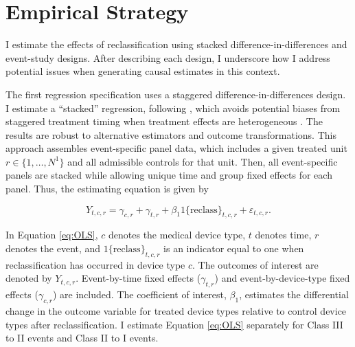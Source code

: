 \documentclass[letterpaper,12pt]{article}
\theoremstyle{definition}
\begin{document}
\section{Empirical Strategy}\label{sec:Empirical}
I estimate the effects of reclassification using stacked difference-in-differences and event-study designs. After describing each design, I underscore how I address potential issues when generating causal estimates in this context.

The first regression specification uses a staggered difference-in-differences design. I estimate a ``stacked'' regression, following \citet{cengiz2019effect}, which avoids potential biases from staggered treatment timing when treatment effects are heterogeneous \citep{goodman2018difference,de2019two}. The results are robust to alternative estimators and outcome transformations.\footnotemark {} This approach assembles event-specific panel data, which includes a given treated unit $r \in \{1,\dots, N^1\}$ and all admissible controls for that unit. Then, all event-specific panels are stacked while allowing unique time and group fixed effects for each panel. Thus, the estimating equation is given by



\begin{equation}
Y_{t,c,r}=\gamma_{c,r} + \gamma_{t,r} + \beta_1 1\text{\{reclass\}}_{t,c,r} + \varepsilon_{t, c,r} \label{eq:OLS}.
\end{equation}


In Equation \ref{eq:OLS}, $c$ denotes the medical device type, $t$ denotes time, $r$ denotes the event, and $1\text{\{reclass\}}_{t,c,r}$ is an indicator equal to one when reclassification has occurred in device type $c$. The outcomes of interest are denoted by $Y_{t, c,r}$. Event-by-time fixed effects ($\gamma_{t,r}$) and event-by-device-type fixed effects ($\gamma_{c,r}$) are included. The coefficient of interest, $\beta_1$, estimates the differential change in the outcome variable for treated device types relative to control device types after reclassification. I estimate Equation \ref{eq:OLS} separately for Class III to II events and Class II to I events. 
\end{document}
